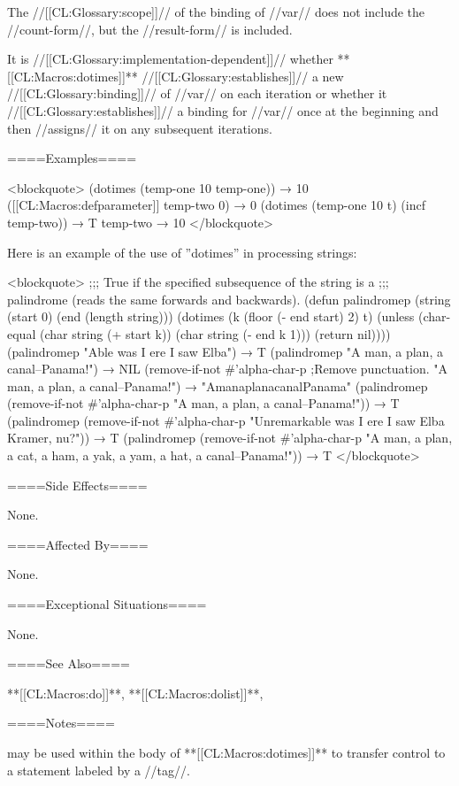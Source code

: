 The //[[CL:Glossary:scope]]// of the binding of //var// does not include the //count-form//, but the //result-form// is included.

It is //[[CL:Glossary:implementation-dependent]]// whether **[[CL:Macros:dotimes]]** //[[CL:Glossary:establishes]]// a new //[[CL:Glossary:binding]]// of //var// on each iteration or whether it //[[CL:Glossary:establishes]]// a binding for //var// once at the beginning and then //assigns// it on any subsequent iterations.

====Examples====

<blockquote> (dotimes (temp-one 10 temp-one)) → 10 ([[CL:Macros:defparameter]] temp-two 0) → 0 (dotimes (temp-one 10 t) (incf temp-two)) → T temp-two → 10 </blockquote>

Here is an example of the use of ''dotimes'' in processing strings:

<blockquote> ;;; True if the specified subsequence of the string is a ;;; palindrome (reads the same forwards and backwards). (defun palindromep (string \optional (start 0) (end (length string))) (dotimes (k (floor (- end start) 2) t) (unless (char-equal (char string (+ start k)) (char string (- end k 1))) (return nil)))) (palindromep "Able was I ere I saw Elba") → T (palindromep "A man, a plan, a canal--Panama!") → NIL (remove-if-not #'alpha-char-p ;Remove punctuation. "A man, a plan, a canal--Panama!") → "AmanaplanacanalPanama" (palindromep (remove-if-not #'alpha-char-p "A man, a plan, a canal--Panama!")) → T (palindromep (remove-if-not #'alpha-char-p "Unremarkable was I ere I saw Elba Kramer, nu?")) → T (palindromep (remove-if-not #'alpha-char-p "A man, a plan, a cat, a ham, a yak, a yam, a hat, a canal--Panama!")) → T </blockquote>

====Side Effects====

None.

====Affected By====

None.

====Exceptional Situations====

None.

====See Also====

**[[CL:Macros:do]]**, **[[CL:Macros:dolist]]**, 

====Notes====

 may be used within the body of **[[CL:Macros:dotimes]]** to transfer control to a statement labeled by a //tag//.

